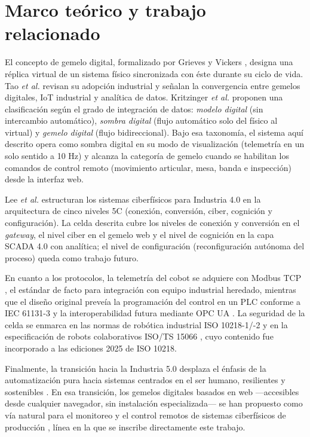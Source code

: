 \documentclass{styles/svproc}
\begin{document}
\section{Marco teórico y trabajo relacionado}
El concepto de gemelo digital, formalizado por Grieves y Vickers
\cite{grieves2017digital}, designa una réplica virtual de un sistema físico
sincronizada con éste durante su ciclo de vida. Tao \emph{et al.}
\cite{tao2019digital} revisan su adopción industrial y señalan la
convergencia entre gemelos digitales, IoT industrial y analítica de datos.
Kritzinger \emph{et al.} \cite{kritzinger2018digital} proponen una
clasificación según el grado de integración de datos: \emph{modelo digital}
(sin intercambio automático), \emph{sombra digital} (flujo automático solo
del físico al virtual) y \emph{gemelo digital} (flujo bidireccional). Bajo
esa taxonomía, el sistema aquí descrito opera como sombra digital en su
modo de visualización (telemetría en un solo sentido a 10 Hz) y alcanza la
categoría de gemelo cuando se habilitan los comandos de control remoto
(movimiento articular, mesa, banda e inspección) desde la interfaz web.

Lee \emph{et al.} \cite{lee2015cyber} estructuran los sistemas ciberfísicos
para Industria 4.0 en la arquitectura de cinco niveles 5C
(conexión, conversión, ciber, cognición y configuración). La celda descrita
cubre los niveles de conexión y conversión en el \emph{gateway}, el nivel
ciber en el gemelo web y el nivel de cognición en la capa SCADA 4.0 con
analítica; el nivel de configuración (reconfiguración autónoma del proceso)
queda como trabajo futuro.

En cuanto a los protocolos, la telemetría del cobot se adquiere con Modbus
TCP \cite{modbus2012,modbustcp2006}, el estándar de facto para integración con equipo
industrial heredado, mientras que el diseño original preveía la
programación del control en un PLC conforme a IEC 61131-3 \cite{iec61131} y
la interoperabilidad futura mediante OPC UA \cite{iec62541}. La seguridad de
la celda se enmarca en las normas de robótica industrial ISO 10218-1/-2
\cite{iso10218-1,iso10218-2} y en la especificación de robots colaborativos
ISO/TS 15066 \cite{isots15066}, cuyo contenido fue incorporado a las
ediciones 2025 de ISO 10218.

Finalmente, la transición hacia la Industria 5.0 desplaza el énfasis de la
automatización pura hacia sistemas centrados en el ser humano, resilientes
y sostenibles \cite{xu2021industry,ec2021industry5}. En esa transición, los
gemelos digitales basados en web ---accesibles desde cualquier navegador,
sin instalación especializada--- se han propuesto como vía natural para el
monitoreo y el control remotos de sistemas ciberfísicos de producción
\cite{liu2020webbased}, línea en la que se inscribe directamente este
trabajo.
\end{document}
